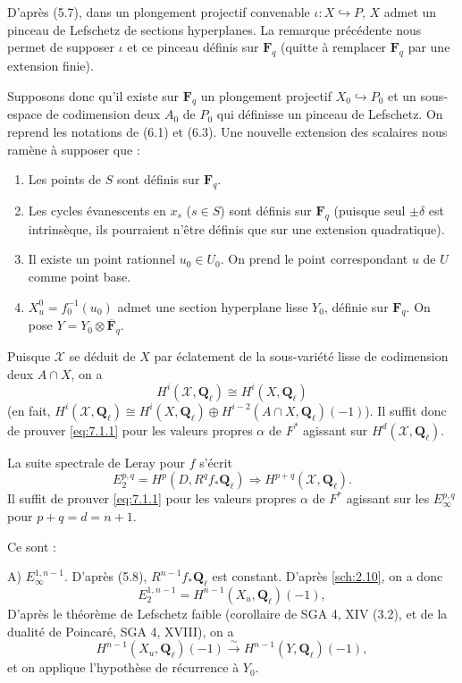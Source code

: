 \documentclass[12pt,a4paper]{amsart}
\theoremstyle{plain}
\theoremstyle{definition}
\theoremstyle{remark}
\newcommand{\Q}{\mathbf{Q}}
\newcommand{\F}{\mathbf{F}}
\numberwithin{equation}{section}
\begin{document}
D'apr\`es (5.7), dans un plongement projectif convenable $\iota:X\hookrightarrow P$, $X$ admet un pinceau de Lefschetz de sections hyperplanes. La remarque pr\'ec\'edente nous permet de supposer $\iota$ et ce pinceau d\'efinis sur $\F_q$ (quitte \`a remplacer $\F_q$ par une extension finie).

Supposons donc qu'il existe sur $\F_q$ un plongement projectif $X_0\hookrightarrow P_0$ et un sous-espace de codimension deux $A_0$ de $P_0$ qui d\'efinisse un pinceau de Lefschetz. On reprend les notations de (6.1) et (6.3). Une nouvelle extension des scalaires nous ram\`ene \`a supposer que :
\begin{enumerate}
\item[a)] Les points de $S$ sont d\'efinis sur $\F_q$.
\item[b)] Les cycles \'evanescents en $x_s$ ($s\in S$) sont d\'efinis sur $\F_q$ (puisque seul $\pm\delta$ est intrins\`eque, ils pourraient n'\^etre d\'efinis que sur une extension quadratique).
\item[c)] Il existe un point rationnel $u_0\in U_0$. On prend le point correspondant $u$ de $U$ comme point base.
\item[d)] $X_u^0=f_0^{-1}(u_0)$ admet une section hyperplane lisse $Y_0$, d\'efinie sur $\F_q$. On pose $Y=Y_0\otimes\overline{\F}_q$.
\end{enumerate}

Puisque $\mathcal{X}$ se d\'eduit de $X$ par \'eclatement de la sous-vari\'et\'e lisse de codimension deux $A\cap X$, on a
\[
H^i(\mathcal{X},\Q_\ell) \cong H^i(X,\Q_\ell)
\]
(en fait, $H^i(\mathcal{X},\Q_\ell) \cong H^i(X,\Q_\ell) \oplus H^{i-2}(A\cap X,\Q_\ell)(-1)$). Il suffit donc de prouver \eqref{eq:7.1.1} pour les valeurs propres $\alpha$ de $F^*$ agissant sur $H^d(\mathcal{X},\Q_\ell)$.

La suite spectrale de Leray pour $f$ s'\'ecrit
\[
E_2^{p,q} = H^p(D, R^q f_\ast \Q_\ell) \Rightarrow H^{p+q}(\mathcal{X}, \Q_\ell).
\]
Il suffit de prouver \eqref{eq:7.1.1} pour les valeurs propres $\alpha$ de $F^*$ agissant sur les $E_\infty^{p,q}$ pour $p+q=d=n+1$.

Ce sont :

\noindent A) $E_\infty^{1,n-1}$. D'apr\`es (5.8), $R^{n-1}f_\ast\Q_\ell$ est constant. D'apr\`es \eqref{sch:2.10}, on a donc
\[
E_2^{1,n-1} = H^{n-1}(X_u,\Q_\ell)(-1),
\]
D'apr\`es le th\'eor\`eme de Lefschetz faible (corollaire de SGA 4, XIV (3.2), et de la dualit\'e de Poincar\'e, SGA 4, XVIII), on a
\[
H^{n-1}(X_u,\Q_\ell)(-1) \xrightarrow{\sim} H^{n-1}(Y,\Q_\ell)(-1),
\]
et on applique l'hypoth\`ese de r\'ecurrence \`a $Y_0$.
\end{document}
